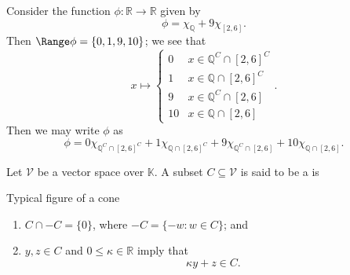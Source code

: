 \documentclass[notoc,notitlepage]{tufte-book}
\begin{document}
\begin{eg}
  Consider the function $\phi : \mathbb{R} \to \mathbb{R}$ given by
  \begin{equation*}
    \phi = \chi_{\mathbb{Q}} + 9 \chi_{[2, 6]}.
  \end{equation*}
  Then $\Range \phi = \{ 0, 1, 9, 10 \}$; we see that
  \begin{equation*}
    x \mapsto \begin{cases}
      0  & x \in \mathbb{Q}^C \cap [2, 6]^C \\
      1  & x \in \mathbb{Q} \cap [2, 6]^C \\
      9  & x \in \mathbb{Q}^C \cap [2, 6] \\
      10 & x \in \mathbb{Q} \cap [2, 6]
    \end{cases}.
  \end{equation*}
  Then we may write $\phi$ as
  \begin{equation*}
    \phi = 0 \chi_{\mathbb{Q}^C \cap [2, 6]^C} + 1 \chi_{\mathbb{Q} \cap [2,
    6]^C} + 9 \chi_{\mathbb{Q}^C \cap [2, 6]} + 10 \chi_{\mathbb{Q} \cap [2,
    6]}.
  \end{equation*}
\end{eg}

\begin{defn}\label{defn:real_cone}
  Let $\mathcal{V}$ be a vector space over $\mathbb{K}$. A subset $C \subseteq
  \mathcal{V}$ is said to be a  is
  \begin{marginfigure}
    \centering
    \caption{Typical figure of a cone}\label{fig:typical_figure_of_a_cone}
  \end{marginfigure}
  \begin{enumerate}
    \item $C \cap -C = \{ 0 \}$, where $-C = \{ - w : w \in C \}$; and
    \item $y, z \in C$ and $0 \leq \kappa \in \mathbb{R}$ imply that
      \begin{equation*}
        \kappa y + z \in C.
      \end{equation*}
  \end{enumerate}
\end{defn}
\end{document}
